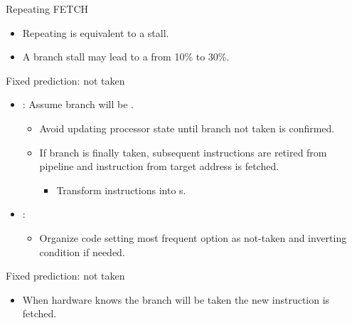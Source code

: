 \begin{frame}[t]{Repeating FETCH}
\makebox[\textwidth][c]{

}

\begin{itemize}
  \item Repeating  is equivalent to a stall.
  \item A branch stall may lead to a  from 10\% to 30\%.
\end{itemize}
\end{frame}

\begin{frame}[t]{Fixed prediction: not taken}
\begin{itemize}
  \item {}: Assume branch will be .
    \begin{itemize}
      \item Avoid updating processor state until branch not taken
            is confirmed.
      \item If branch is finally taken, subsequent instructions are retired
            from pipeline and instruction from target address is fetched.
        \begin{itemize}
          \item Transform instructions into s.
        \end{itemize}
    \end{itemize}

  \item {}:
    \begin{itemize}
      \item Organize code setting most frequent option as not-taken and inverting condition if needed.
    \end{itemize}
\end{itemize}
\end{frame}

\begin{frame}[t]{Fixed prediction: not taken}
\makebox[\textwidth][c]{

}
\begin{itemize}
  \item When hardware knows the branch will be taken  the new instruction is fetched.
\end{itemize}
\end{frame}

